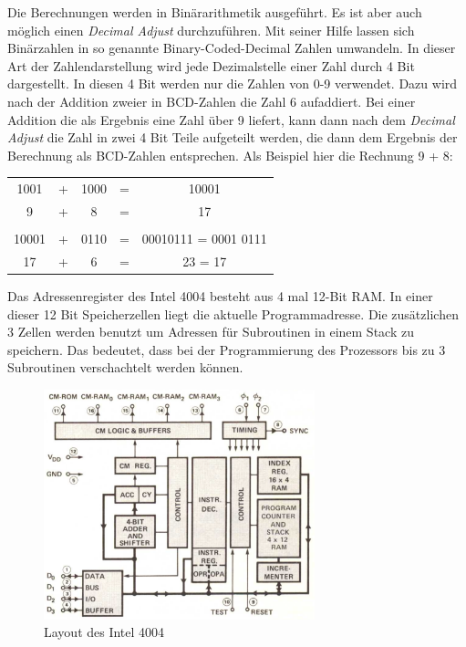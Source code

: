 Die Berechnungen werden in Binärarithmetik ausgeführt. Es ist aber auch möglich einen \textit{Decimal Adjust} durchzuführen. Mit seiner Hilfe lassen sich Binärzahlen in so genannte Binary-Coded-Decimal Zahlen umwandeln. In dieser Art der Zahlendarstellung wird jede Dezimalstelle einer Zahl durch 4 Bit dargestellt. In diesen 4 Bit werden nur die Zahlen von 0-9 verwendet. Dazu wird nach der Addition zweier in BCD-Zahlen die Zahl 6 aufaddiert. Bei einer Addition die als Ergebnis eine Zahl über 9 liefert, kann dann nach dem \textit{Decimal Adjust} die Zahl in zwei 4 Bit Teile aufgeteilt werden, die dann dem Ergebnis der Berechnung als BCD-Zahlen entsprechen. Als Beispiel hier die Rechnung 9 + 8:
\begin{table}[H]
	\centering
	\begin{tabular}{c c c c c}
		1001 & + & 1000 & = & 10001 \\
		9 & + & 8  & = & 17 \\
		& & & & \\
		10001 & + & 0110 & = & 00010111 = 0001 0111 \\
		17 & + & 6 & = & 23 = 17
	\end{tabular}
\end{table}

Das Adressenregister des Intel 4004 besteht aus 4 mal 12-Bit RAM. In einer dieser 12 Bit Speicherzellen liegt die aktuelle Programmadresse. Die zusätzlichen 3 Zellen werden benutzt um Adressen für Subroutinen in einem Stack zu speichern. Das bedeutet, dass bei der Programmierung des Prozessors bis zu 3 Subroutinen verschachtelt werden können.
 \begin{figure}[h]
 	\centering
 	\includegraphics[width=0.7\textwidth]{figures/layout_4004.png}
 	\caption{Layout des Intel 4004}
 	\label{fig:layout_4004}
 \end{figure}
 


